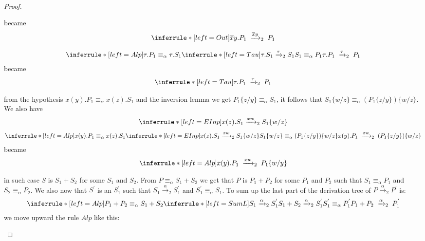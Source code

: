 \begin{theorem}
\begin{proof}
\begin{description}
\begin{description}
\[{	      }
	    \]
	    became
	    \[
	      \inferrule* [left=Out]{
	      }{
		\overline{x}y.P_{1}\; \xrightarrow{\overline{x}y}_{2}\; P_{1}
	      }
	    \]
	  \item[Tau]
	    \[
	      \inferrule* [left=Alp]{
		  \tau.P_{1}\equiv_{\alpha}\tau.S_{1}
		\\
		  \inferrule* [left=Tau]{
		  }{
		    \tau.S_{1}\xrightarrow{\tau}_{2}S_{1}
		  }
		\\
		  S_{1}\equiv_{\alpha} P_{1}
	      }{
		\tau.P_{1}\; \xrightarrow{\tau}_{2}\; P_{1}
	      }
	    \]
	    became
	    \[
	      \inferrule* [left=Tau]{
	      }{
		\tau.P_{1}\; \xrightarrow{\tau}_{2}\; P_{1}
	      }
	    \]
	  \item[EInp]
	    from the hypothesis $x(y).P_{1}\equiv_{\alpha}x(z).S_{1}$ and the inversion lemma we get $P_{1}\{z/y\}\equiv_{\alpha}S_{1}$, it follows that $S_{1}\{w/z\}\equiv_{\alpha} (P_{1}\{z/y\})\{w/z\}$. We also have
	    \[
		  \inferrule* [left=EInp]{
		  }{
		    x(z).S_{1}\xrightarrow{x w}_{2}S_{1}\{w/z\}
		  }	     
	    \]
	    \[
	      \inferrule* [left=Alp]{
		  x(y).P_{1}\equiv_{\alpha}x(z).S_{1}
		\\
		  \inferrule* [left=EInp]{
		  }{
		    x(z).S_{1}\xrightarrow{x w}_{2}S_{1}\{w/z\}
		  }
		\\
		  S_{1}\{w/z\}\equiv_{\alpha} (P_{1}\{z/y\})\{w/z\}
	      }{
		x(y).P_{1}\; \xrightarrow{xw}_{2}\; (P_{1}\{z/y\})\{w/z\}
	      }
	    \]
	    became
	    \[
	      \inferrule* [left=Alp]{
	      }{
		x(y).P_{1}\; \xrightarrow{xw}_{2}\; P_{1}\{w/y\}
	      }
	    \]
	  \item[SumL] 
	    in such case $S$ is $S_{1}+S_{2}$ for some $S_{1}$ and $S_{2}$. From $P\equiv_{\alpha} S_{1}+S_{2}$ we get that $P$ is $P_{1}+P_{2}$ for some $P_{1}$ and $P_{2}$ such that $S_{1}\equiv_{\alpha}P_{1}$ and $S_{2}\equiv_{\alpha}P_{2}$. We also now that $S^{'}$ is an $S_{1}^{'}$ such that $S_{1}\xrightarrow{\alpha}_{2}S_{1}^{'}$ and $S_{1}^{'}\equiv_{\alpha} S_{1}$. To sum up the last part of the derivation tree of $P\xrightarrow{\alpha}_{2}P^{'}$ is:
	    \[
	      \inferrule* [left=Alp]{
		  P_{1}+P_{2}\equiv_{\alpha}S_{1}+S_{2}
		\\
		  \inferrule* [left=SumL]{
		    S_{1}\xrightarrow{\alpha}_{2}S_{1}^{'}
		  }{
		    S_{1}+S_{2}\xrightarrow{\alpha}_{2}S_{1}^{'}
		  }
		\\
		  S_{1}^{'}\equiv_{\alpha} P_{1}^{'}
	      }{
		P_{1}+P_{2}\; \xrightarrow{\alpha}_{2}\; P_{1}^{'}
	      }
	    \]
	    we move upward the rule $Alp$ like this:
	    \[
\]
\end{description}
\end{description}
\end{proof}
\end{theorem}
